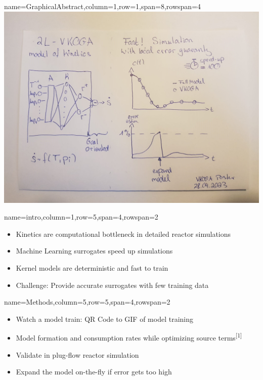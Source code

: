 \documentclass[
	accentcolor=3c,
	boxstyle=colored, %
	colorback=false,
	title=small
	]{tudasciposter}
\begin{document}
\begin{tcbposter}[
	poster={
		columns=8,
		rows=12,
		spacing=1cm,
	},]

\begin{posterboxenv}{name=GraphicalAbstract,column=1,row=1,span=8,rowspan=4}
	\centering
	\includegraphics[width=.4\textwidth]{abb/VKOGA_Graphical_Abstract_draft.jpeg}
\end{posterboxenv}

\begin{posterboxenv}[title=1. Introduction]{name=intro,column=1,row=5,span=4,rowspan=2}
	\begin{itemize}
		\item Kinetics are computational bottleneck in detailed reactor simulations
		\item Machine Learning surrogates speed up simulations
		\item Kernel models are deterministic and fast to train 
		\item Challenge: Provide accurate surrogates with few training data
	\end{itemize}
\end{posterboxenv}

\begin{posterboxenv}[title=2. Methods]{name=Methods,column=5,row=5,span=4,rowspan=2}
	\begin{itemize}
		\item Watch a model train: QR Code to GIF of model training
		\item Model formation and consumption rates while optimizing source terms\textsuperscript{[1]}
		\item Validate in plug-flow reactor simulation
		\item Expand the model on-the-fly if error gets too high
	\end{itemize}

\end{posterboxenv}


\end{tcbposter}
\end{document}
